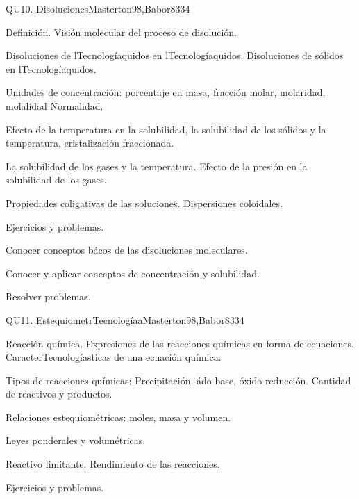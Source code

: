 \begin{syllabus}
\begin{unit}{}{QU10. Disoluciones}{Masterton98,Babor83}{3}{4}
\begin{topics}
      \item Definición. Visión molecular del proceso de disolución.
      \item Disoluciones de lTecnologíaquidos en lTecnologíaquidos. Disoluciones de sólidos en lTecnologíaquidos.
      \item Unidades de concentración: porcentaje en masa, fracción molar, molaridad, molalidad Normalidad.
      \item Efecto de la temperatura en la solubilidad, la solubilidad de los sólidos y la temperatura, cristalización fraccionada.
      \item La solubilidad de los gases y la temperatura. Efecto  de la presión en la solubilidad de los gases.
      \item Propiedades coligativas de las soluciones. Dispersiones coloidales.
      \item Ejercicios y problemas.
    \end{topics}

   \begin{learningoutcomes}
      \item Conocer conceptos bácos de las disoluciones moleculares.
      \item Conocer y aplicar conceptos de concentración y solubilidad.
      \item Resolver problemas.
   \end{learningoutcomes}
\end{unit}

\begin{unit}{}{QU11. EstequiometrTecnologíaa}{Masterton98,Babor83}{3}{4}
\begin{topics}
      \item Reacción química. Expresiones de las reacciones químicas en forma de ecuaciones. CaracterTecnologíasticas de una ecuación química.
      \item Tipos de reacciones químicas: Precipitación, ádo-base, óxido-reducción. Cantidad de reactivos y productos.
      \item Relaciones estequiométricas: moles, masa y volumen.
      \item Leyes ponderales y volumétricas.
      \item Reactivo limitante. Rendimiento de las reacciones.
      \item Ejercicios y problemas.
    \end{topics}


\end{unit}
\end{syllabus}

